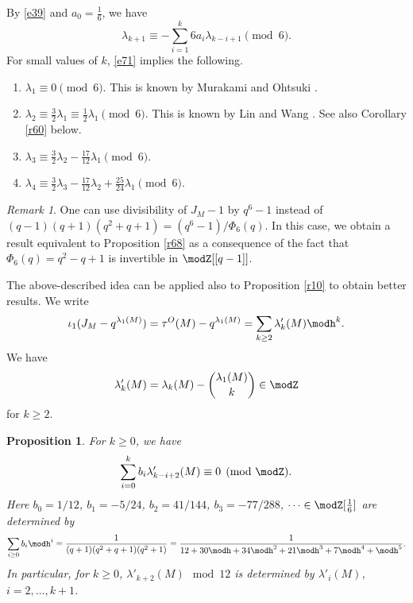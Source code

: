 \documentclass{amsart}
\numberwithin{equation}{section}
\numberwithin{figure}{section}
\theoremstyle{plain}
\newtheorem{proposition}[theorem]{Proposition}
\theoremstyle{definition}
\theoremstyle{remark}
\newtheorem{remark}[theorem]{Remark}
\begin{document}
By \eqref{e39} and $a_0=\frac16$, we have
\begin{equation}
  \label{e71}
  \lambda _{k+1}\equiv - \sum_{i=1}^k 6a_i\lambda _{k-i+1}\pmod6.
\end{equation}
For small values of $k$, \eqref{e71} implies the following.
\begin{enumerate}
\item\label{item:5} $\lambda _1\equiv0\pmod6$.  This is known by Murakami
  \cite{Murakami1} and Ohtsuki \cite{Ohtsuki1}.
\item\label{item:6}
  $\lambda _2\equiv\frac{3}{2}\lambda _1\equiv\frac{1}{2}\lambda _1\pmod6$.  This is
  known by Lin and Wang \cite{Lin-Wang}.  See also Corollary \ref{r60}
  below.
\item\label{item:7} $\lambda _3\equiv\frac{3}{2}\lambda _2-\frac{17}{12}\lambda _1\pmod6$.
\item\label{item:8} $\lambda _4\equiv\frac{3}{2}\lambda _3-\frac{17}{12}\lambda _2+\frac{25}{24}\lambda _1\pmod6$.
\end{enumerate}

\begin{remark}
  \label{r69}
  One can use divisibility of $J_M-1$ by $q^6-1$ instead of
  $(q-1)(q+1)(q^2+q+1)=(q^6-1)/\Phi _6(q)$.  In this case, we obtain a
  result equivalent to Proposition \ref{r68} as a consequence of the
  fact that $\Phi _6(q)=q^2-q+1$ is invertible in $\modZ [[q-1]]$.
\end{remark}

The above-described idea can be applied also to Proposition \ref{r10}
to obtain better results.  We write
\begin{gather*}
  \iota _1(J_M-q^{\lambda _1(M)})=\tau ^O(M)-q^{\lambda _1(M)}=\sum_{k\ge 2}\lambda '_k(M)\modh ^k.
\end{gather*}
We have
\begin{equation}
  \label{e69}
  \lambda '_k(M) = \lambda _k(M)-\binom{\lambda _1(M)}{k}\in \modZ 
\end{equation}
for $k\ge 2$.

\begin{proposition}
  \label{r70}
  For $k\ge 0$, we have
  \begin{equation}
    \label{e68}
    \sum_{i=0}^k b_i\lambda '_{k-i+2}(M)\equiv0\pmod{\modZ }.
  \end{equation}
  Here $b_0=1/12$, $b_1=-5/24$, $b_2=41/144$, $b_3=-77/288$,
  $\dots\in \modZ [\frac16]$ are determined by
  \begin{equation*}
    \sum_{i\ge 0}b_i\modh ^i=\frac1{(q+1)(q^2+q+1)(q^2+1)}
    =\frac{1}{12+30\modh +34\modh ^2+21\modh ^3+7\modh ^4+\modh ^5}.
  \end{equation*}
  In particular, for $k\ge 0$, $\lambda '_{k+2}(M)\mod{12}$ is determined
  by $\lambda '_i(M)$, $i=2,\ldots,k+1$.
\end{proposition}
\end{document}
